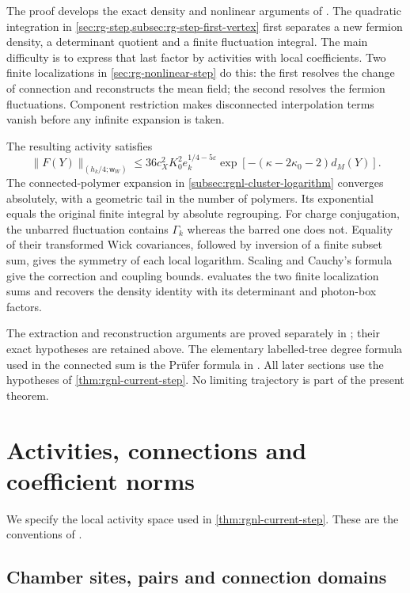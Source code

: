 \documentclass[11pt,letterpaper,reqno]{amsart}
\begin{document}
The proof develops the exact density and nonlinear arguments of
\cite[\S\S13--14]{QED3Master}. The quadratic integration in \cref{sec:rg-step,subsec:rg-step-first-vertex} first
separates a new fermion density, a determinant quotient and a finite
fluctuation integral. The main difficulty is to express that last
factor by activities with local coefficients. Two finite
localizations in \cref{sec:rg-nonlinear-step} do this: the first resolves the change of connection
and reconstructs the mean field; the second resolves the fermion
fluctuations. Component restriction makes disconnected interpolation
terms vanish before any infinite expansion is taken.

The resulting activity satisfies
\[
 \|F(Y)\|_{(h_k/4;\mathsf w_W)}
 \le36c_X^2K_0^2e_k^{1/4-5\varepsilon}
                 \exp[-(\kappa-2\kappa_0-2)d_M(Y)].
\]
The connected-polymer expansion in \cref{subsec:rgnl-cluster-logarithm}
converges absolutely, with a
geometric tail in the number of polymers. Its exponential equals
the original finite integral by absolute regrouping. For charge
conjugation, the unbarred fluctuation contains $\Gamma_k$ whereas
the barred one does not. Equality of their transformed Wick
covariances, followed by inversion of a finite subset sum, gives
the symmetry of each local logarithm. Scaling and Cauchy's formula
give the correction and coupling bounds. 
evaluates the two finite localization sums and recovers the density
identity with its determinant and photon-box factors.

The extraction and reconstruction arguments are proved separately in
\cite{NormalizedContraction}; their exact hypotheses are retained
above. The elementary labelled-tree degree formula used in the
connected sum is the Pr\"ufer formula in
\cite[Proposition~4]{PostnikovLin2019}. All later sections use the
hypotheses of \cref{thm:rgnl-current-step}. No limiting trajectory is
part of the present theorem.
\section{Activities, connections and coefficient norms}
\label{sec:activities}

We specify the local activity space used in \cref{thm:rgnl-current-step}.
These are the conventions of \cite[\S2]{NormalizedContraction}.

\subsection{Chamber sites, pairs and connection domains}
\end{document}
